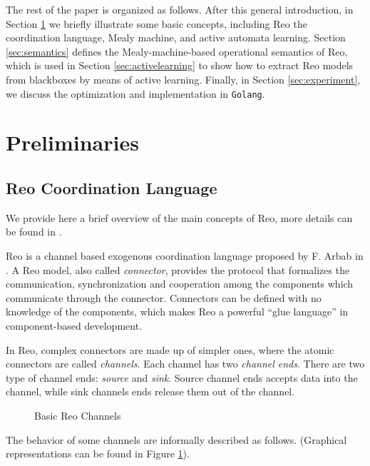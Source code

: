 \documentclass[conference, a4paper]{IEEEtran}
\begin{document}
The rest of the paper is organized as follows. After this general introduction, in Section
\ref{sec:preliminaries} we briefly illustrate some basic concepts, including Reo the coordination
language, Mealy machine, and active automata learning. Section \ref{sec:semantics} defines the
Mealy-machine-based operational semantics of Reo, which is used in Section \ref{sec:activelearning}
to show how to extract Reo models from blackboxes by means of active learning. Finally, in Section
\ref{sec:experiment}, we discuss the optimization and implementation in \texttt{Golang}.

\section{Preliminaries} 
\label{sec:preliminaries}
\subsection{Reo Coordination Language} 
\label{sec:reo}
We provide here a brief overview of the main concepts of Reo, more details can be found in
\cite{DBLP:journals/mscs/Arbab04, DBLP:journals/scp/BaierSAR06}.

Reo is a channel based exogenous coordination language proposed by F. Arbab in
\cite{DBLP:journals/mscs/Arbab04}. 
A Reo model, also called \emph{connector}, provides the protocol
that formalizes the communication, synchronization and cooperation among the components which
communicate through the connector. Connectors can be defined with no knowledge of the components,
which makes Reo a powerful ``glue language'' in component-based
development\cite{DBLP:journals/sigsoft/Gill03}.

In Reo, complex connectors are made up of simpler ones, where the atomic connectors are called
\emph{channels}. Each channel has two \emph{channel ends}. There are two type of channel ends:
\emph{source} and \emph{sink}. Source channel ends accepts data into the channel, while sink
channels ends release them out of the channel. 

\begin{figure}[h]
  \begin{center}
    
  \end{center}
  \caption{Basic Reo Channels}
  \label{fig:basic}
\end{figure}

The behavior of some channels are informally described as follows. (Graphical representations
can be found in Figure \ref{fig:basic}).
\end{document}
